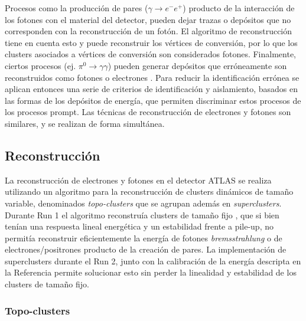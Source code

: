 Procesos como la producción de pares ($\gamma\to e^{-}e^{+}$) producto de la interacción de los fotones con el material del detector, pueden dejar trazas o depósitos que no corresponden con la reconstrucción de un fotón. El algoritmo de reconstrucción tiene en cuenta esto y puede reconstruir los vértices de conversión, por lo que los clusters asociados a vértices de conversión son considerados fotones. Finalmente, ciertos procesos (ej. $\pi^{0}\to\gamma\gamma$) pueden generar depósitos que erróneamente son reconstruidos como fotones o electrones
. Para reducir la identificación errónea se aplican entonces una serie de criterios de identificación y aislamiento, basados en las formas de los depósitos de energía, que permiten discriminar estos procesos de los procesos prompt.
Las técnicas de reconstrucción de electrones y fotones son similares, y se realizan de forma simultánea.

\subsection{Reconstrucción}


La reconstrucción de electrones y fotones en el detector ATLAS se realiza utilizando un algoritmo para la reconstrucción de clusters dinámicos de tamaño variable, denominados \textit{topo-clusters} que se agrupan además en \textit{superclusters}\cite{EGAM-2018-01}. Durante Run 1 el algoritmo reconstruía clusters de tamaño fijo \cite{PERF-2013-04, PERF-2013-05, Lampl:1099735}, que si bien tenían una respuesta lineal energética y un estabilidad frente a pile-up, no permitía reconstruir eficientemente la energía de fotones \textit{bremsstrahlung} o de electrones/positrones producto de la creación de pares. La implementación de superclusters durante el Run 2, junto con la calibración de la energía descripta en la Referencia \cite{PERF-2017-03} permite solucionar esto sin perder la linealidad y estabilidad de los clusters de tamaño fijo.

\subsubsection{Topo-clusters}

